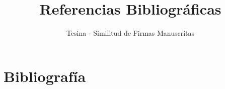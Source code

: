 \documentclass[11pt]{article}
\title{Referencias Bibliográficas}
\author{Tesina - Similitud de Firmas Manuscritas}
\date{}
\begin{document}
\maketitle

\section*{Bibliografía}


\end{document}
